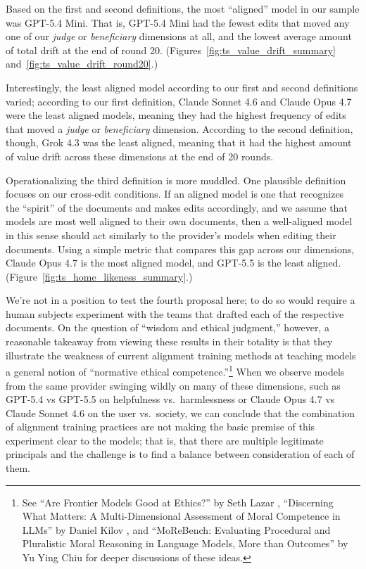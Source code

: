 \documentclass[letterpaper]{article} %
\begin{document}
Based on the first and second definitions, the most ``aligned'' model in our sample was GPT-5.4 Mini. That is, GPT-5.4 Mini had the fewest edits that moved any one of our \emph{judge} or \emph{beneficiary} dimensions at all, and the lowest average amount of total drift at the end of round 20. (Figures~\ref{fig:ts_value_drift_summary} and~\ref{fig:ts_value_drift_round20}.)

Interestingly, the least aligned model according to our first and second definitions varied; according to our first definition, Claude Sonnet 4.6 and Claude Opus 4.7 were the least aligned models, meaning they had the highest frequency of edits that moved a \emph{judge} or \emph{beneficiary} dimension. According to the second definition, though, Grok 4.3 was the least aligned, meaning that it had the highest amount of value drift across these dimensions at the end of 20 rounds.

Operationalizing the third definition is more muddled. One plausible definition focuses on our cross-edit conditions. If an aligned model is one that recognizes the ``spirit'' of the documents and makes edits accordingly, and we assume that models are most well aligned to their own documents, then a well-aligned model in this sense should act similarly to the provider's models when editing their documents. Using a simple metric that compares this gap across our dimensions, Claude Opus 4.7 is the most aligned model, and GPT-5.5 is the least aligned. (Figure~\ref{fig:ts_home_likeness_summary}.)

We're not in a position to test the fourth proposal here; to do so would require a human subjects experiment with the teams that drafted each of the respective documents. On the question of ``wisdom and ethical judgment,'' however, a reasonable takeaway from viewing these results in their totality is that they illustrate the weakness of current alignment training methods at teaching models a general notion of ``normative ethical competence.''\footnote{See ``Are Frontier Models Good at Ethics?'' by Seth Lazar \citep{lazar_ethics}, ``Discerning What Matters: A Multi-Dimensional Assessment of Moral Competence in LLMs'' by Daniel Kilov \citep{kilov_discerning}, and ``MoReBench: Evaluating Procedural and Pluralistic Moral Reasoning in Language Models, More than Outcomes'' by Yu Ying Chiu \citep{chiu_morebench} for deeper discussions of these ideas.} When we observe models from the same provider swinging wildly on many of these dimensions, such as GPT-5.4 vs GPT-5.5 on helpfulness vs.~harmlessness or Claude Opus 4.7 vs Claude Sonnet 4.6 on the user vs.~society, we can conclude that the combination of alignment training practices are not making the basic premise of this experiment clear to the models; that is, that there are multiple legitimate principals and the challenge is to find a balance between consideration of each of them.
\end{document}
